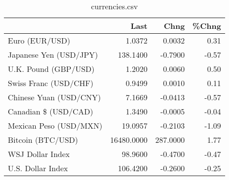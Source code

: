 \documentclass{article}%
\begin{document}
%


\begin{table}[htbp]%
\caption{currencies.csv}%
\centering%
\begin{adjustbox}{width=1\textwidth}%
\begin{tabular}{lrrr}
\toprule
                       &       Last &     Chng &  \%Chng \\
\midrule
        Euro (EUR/USD) &     1.0372 &   0.0032 &   0.31 \\
Japanese Yen (USD/JPY) &   138.1400 &  -0.7900 &  -0.57 \\
  U.K. Pound (GBP/USD) &     1.2020 &   0.0060 &   0.50 \\
 Swiss Franc (USD/CHF) &     0.9499 &   0.0010 &   0.11 \\
Chinese Yuan (USD/CNY) &     7.1669 &  -0.0413 &  -0.57 \\
  Canadian \$ (USD/CAD) &     1.3490 &  -0.0005 &  -0.04 \\
Mexican Peso (USD/MXN) &    19.0957 &  -0.2103 &  -1.09 \\
     Bitcoin (BTC/USD) & 16480.0000 & 287.0000 &   1.77 \\
      WSJ Dollar Index &    98.9600 &  -0.4700 &  -0.47 \\
     U.S. Dollar Index &   106.4200 &  -0.2600 &  -0.25 \\
\bottomrule
\end{tabular}
%
\end{adjustbox}%
\end{table}

%
\end{document}
